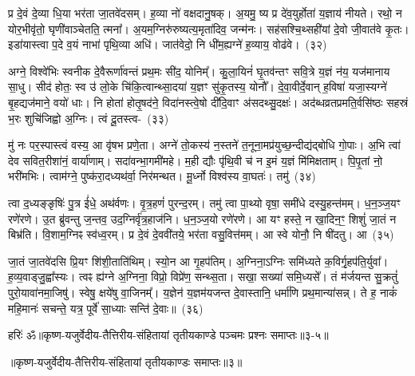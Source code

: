प्र दे॒वं दे॒व्या धि॒या भर॑ता जा॒तवे॑दसम्। ह॒व्या नो॑ वक्षदा\-नु॒षक्। अ॒यमु॒ ष्य प्र दे॑व॒युर्\mbox{}होता॑ य॒ज्ञाय॑ नीयते। रथो॒ न यो\-र॒भी\-वृ॑तो॒ घृणी॑वाञ्चेतति॒ त्मना᳚। अ॒यम॒ग्निरु॑रुष्यत्य॒मृता॑दिव॒ जन्म॑नः। सह॑सश्चि॒थ्सही॑यां दे॒वो जी॒वात॑वे कृ॒तः। इडा॑यास्त्वा प॒दे व॒यं नाभा॑ पृथि॒व्या अधि॑। जात॑वेदो॒ नि धी॑म॒ह्यग्ने॑ ह॒व्याय॒ वोढ॑वे।~(३२)\ip

अग्ने॒ विश्वे॑भिः स्वनीक दे॒वैरूर्णा॑वन्तं प्रथ॒मः सी॑द॒ योनिम्᳚। कु॒ला॒यिनं॑ घृ॒तव॑न्तꣳ सवि॒त्रे य॒ज्ञं न॑य॒ यज॑मानाय सा॒धु। सीद॑ होतः॒ स्व उ॑ लो॒के चि॑कि॒त्वान्थ्सा॒दया॑ य॒ज्ञꣳ सु॑कृ॒तस्य॒ योनौ᳚। दे॒वा॒वीर्दे॒वान् ह॒विषा॑ यजा॒स्यग्ने॑ बृ॒हद्यज॑माने॒ वयो॑ धाः। नि होता॑ होतृ॒षद॑ने॒ विदा॑नस्त्वे॒षो दी॑दि॒वाꣳ अ॑सदथ्सु॒दक्षः॑। अद॑ब्ध\-व्रत\-प्रमति॒र्वसि॑ष्ठः सहस्रं भ॒रः शुचि॑जिह्वो अ॒ग्निः। त्वं दू॒तस्त्व-~(३३)\ip

मु॑ नः पर॒स्पास्त्वं वस्य॒ आ वृ॑षभ प्रणे॒ता। अग्ने॑ तो॒कस्य॑ न॒स्तने॑ त॒नूना॒मप्र॑\-युच्छ॒न्दीद्य॑द्बोधि गो॒पाः। अ॒भि त्वा॑ देव सवित॒रीशा॑नं॒ वार्या॑णाम्। सदा॑वन्भा॒गमी॑महे। म॒ही द्यौः पृ॑थि॒वी च॑ न इ॒मं य॒ज्ञं मि॑मिक्षताम्। पि॒पृ॒तां नो॒ भरी॑मभिः। त्वाम॑ग्ने॒ पुष्क॑रा॒दध्यथ॑र्वा॒ निर॑मन्थत। मू॒र्ध्नो विश्व॑स्य वा॒घतः॑। तमु॑~(३४)\ip

त्वा द॒ध्यङ्ङृषिः॑ पु॒त्र ई॑धे॒ अथ॑र्वणः। वृ॒त्र॒हणं॑ पुरन्द॒रम्। तमु॑ त्वा पा॒थ्यो वृषा॒ समी॑धे दस्यु॒हन्त॑मम्। ध॒न॒ञ्ज॒यꣳ रणे॑रणे। उ॒त ब्रु॑वन्तु ज॒न्तव॒ उद॒ग्निर्वृ॑त्र॒हाज॑नि। ध॒न॒ञ्ज॒यो रणे॑रणे। आ यꣳ हस्ते॒ न खा॒दिन॒ꣳ॒ शिशुं॑ जा॒तं न बिभ्र॑ति। वि॒शाम॒ग्निꣴ स्व॑ध्व॒रम्। प्र दे॒वं दे॒ववी॑तये॒ भर॑ता वसु॒वित्त॑मम्। आ स्वे योनौ॒ नि षी॑दतु। आ~(३५)\ip


जा॒तं जा॒तवे॑दसि प्रि॒यꣳ शि॑शी॒ताति॑थिम्। स्यो॒न आ गृ॒ह\-प॑तिम्। अ॒ग्निना॒\-ऽग्निः समि॑ध्यते क॒विर्गृ॒हप॑ति॒र्युवा᳚। ह॒व्य॒वाड्\-जु॒ह्वा᳚स्यः। त्वꣴ ह्य॑ग्ने अ॒ग्निना॒ विप्रो॒ विप्रे॑ण॒ सन्थ्स॒ता। सखा॒ सख्या॑ समि॒ध्यसे᳚। तं म॑र्जयन्त सु॒क्रतुं॑ पुरो॒यावा॑नमा॒जिषु॑। स्वेषु॒ क्षये॑षु वा॒जिनम्᳚। य॒ज्ञेन॑ य॒ज्ञम॑यजन्त दे॒वास्तानि॒ धर्मा॑णि प्रथ॒मान्या॑सन्न्। ते ह॒ नाकं॑ महि॒मानः॑ सचन्ते॒ यत्र॒ पूर्वे॑ सा॒ध्याः सन्ति॑ दे॒वाः॥~(३६)\ip

{\anuvakamend[{वोढ॑वे दू॒तस्त्वन्तमु॑ सीद॒त्वा यत्र॑ च॒त्वारि॑ च}]}%

{हरिः॑ ॐ}{॥कृष्ण-यजुर्वेदीय-तैत्तिरीय-संहितायां तृतीयकाण्डे पञ्चमः प्रश्नः समाप्तः॥३-५॥}

\centerline{॥कृष्ण-यजुर्वेदीय-तैत्तिरीय-संहितायां तृतीयकाण्डः समाप्तः॥३॥}

\medskip

\centerline{\hyperref[sec:startkanda3]{\closesection}}


